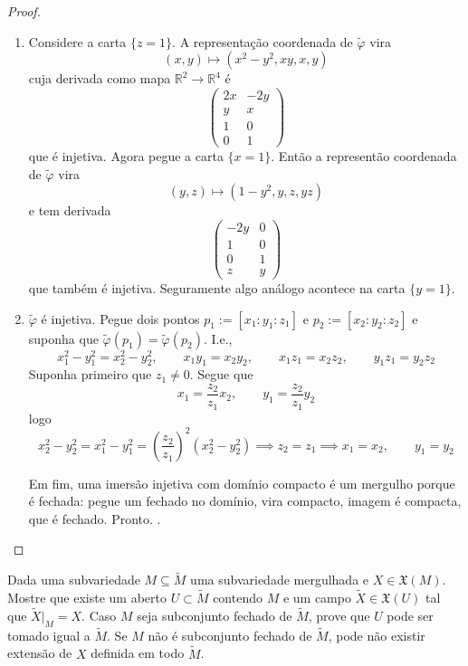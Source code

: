 \begin{proof}
\begin{enumerate}
\item Considere a carta \(\{z=1\}\). A representação coordenada de \(\tilde{\varphi}\) vira
	\[(x,y) \longmapsto (x^2-y^2,xy,x,y)\]
cuja derivada como mapa \(\mathbb{R}^2 \to \mathbb{R}^4\) é
\[\begin{pmatrix} 2x& -2y\\y&x\\1&0\\0&1 \end{pmatrix} \]
que é injetiva. Agora pegue a carta \(\{x=1\}\). Então a representão coordenada de \(\tilde{ \varphi}\) vira
\[(y,z) \longmapsto (1-y^2,y,z,yz)\]
e tem derivada
\[\begin{pmatrix} -2y&0\\1&0\\0&1\\z&y \end{pmatrix} \]
que também é injetiva. Seguramente algo análogo acontece na carta \(\{y=1\}\).

\item \(\tilde{\varphi}\) é injetiva. Pegue dois pontos \(p_1:=[x_1:y_1:z_1]\) e \(p_2:=[x_2:y_2:z_2]\) e suponha que \(\tilde{\varphi}(p_1)=\tilde{\varphi}(p_2)\). I.e.,
	\[x_1^2-y_1^2=x_2^2-y_2^2,\qquad x_1y_1=x_2y_2,\qquad x_1z_1=x_2z_2, \qquad y_1z_1=y_2z_2\]
	Suponha primeiro que \(z_1 \neq  0\). Segue que
	\[x_1=\frac{z_2}{z_1}x_2, \qquad y_1=\frac{z_2}{z_1}y_2\]
	logo
	\[x_2^2-y_2^2=x_1^2-y_1^2=\left(\frac{z_2}{z_1}\right)^2(x_2^2-y_2^2)\implies z_2=z_1\implies x_1=x_2,\qquad y_1=y_2\]
	

	Em fim, uma imersão injetiva com domínio compacto é um mergulho porque é fechada: pegue um fechado no domínio, vira compacto, imagem é compacta, que é fechado. Pronto.
.
\end{enumerate}
\end{proof}

\begin{exercise}
\label{exercise-extension-vector-fields}
Dada uma subvariedade \(M \subseteq \tilde{M}\) uma subvariedade mergulhada e \(X \in \mathfrak{X}(M)\). Mostre que existe um aberto \(U \subset \tilde{M}\) contendo \(M\) e um campo \(\tilde{X} \in \mathfrak{X}(U)\) tal que \(\tilde{X}|_{M}=X\). Caso \(M\) seja subconjunto fechado de \(\tilde{M}\), prove que \(U\) pode ser tomado igual a \(\tilde{M}\). Se \(M\) não é subconjunto fechado de \(\tilde{M}\), pode não existir extensão de \(X\) definida em todo \(\tilde{M}\).
\end{exercise}

